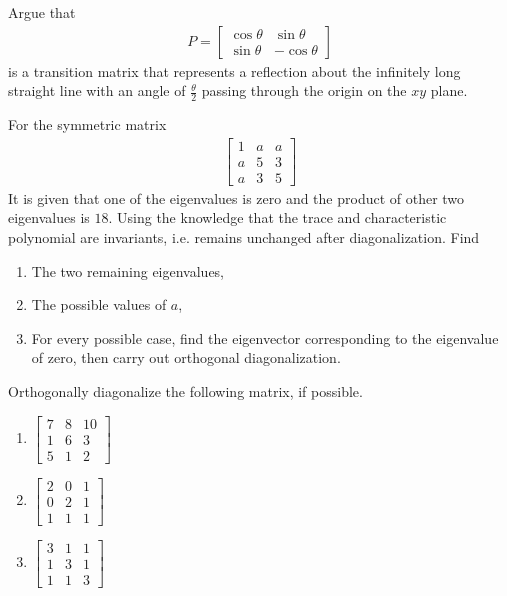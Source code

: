 \begin{Exercise}
Argue that
\begin{align*}
P = 
\begin{bmatrix}
\cos{\theta} & \sin{\theta} \\
\sin{\theta} & -\cos{\theta}
\end{bmatrix}
\end{align*}
is a transition matrix that represents a reflection about the infinitely long straight line with an angle of $\frac{\theta}{2}$ passing through the origin on the $xy$ plane.
\end{Exercise}

\begin{Exercise}
For the symmetric matrix 
\begin{align*}
\begin{bmatrix}
1 & a & a\\
a & 5 & 3\\
a & 3 & 5
\end{bmatrix}
\end{align*}
It is given that one of the eigenvalues is zero and the product of other two eigenvalues is $18$. Using the knowledge that the trace and characteristic polynomial are invariants, i.e. remains unchanged after diagonalization. Find 
\begin{enumerate}[label=(\alph*)]
\item The two remaining eigenvalues,
\item The possible values of $a$,
\item For every possible case, find the eigenvector corresponding to the eigenvalue of zero, then carry out orthogonal diagonalization.
\end{enumerate}
\end{Exercise}

\begin{Exercise}
Orthogonally diagonalize the following matrix, if possible.
\begin{enumerate}[label=(\alph*)]
\item $\begin{bmatrix}
7 & 8 & 10\\
1 & 6 & 3\\
5 & 1 & 2
\end{bmatrix}$
\item $\begin{bmatrix}
2 & 0 & 1\\
0 & 2 & 1\\
1 & 1 & 1
\end{bmatrix}$
\item $\begin{bmatrix}
3 & 1 & 1\\
1 & 3 & 1\\
1 & 1 & 3
\end{bmatrix}$
\end{enumerate}
\end{Exercise}

